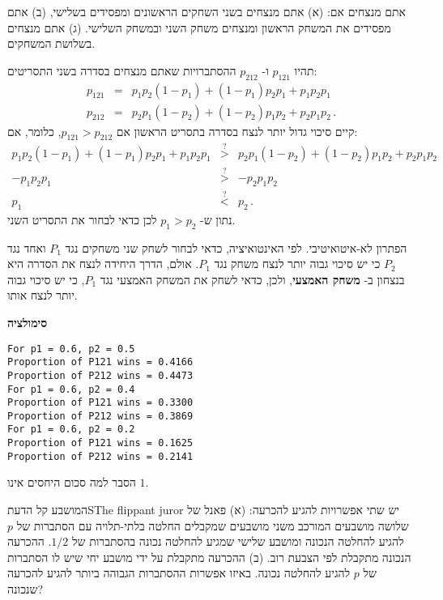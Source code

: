 
אתם מנצחים אם: (א) אתם מנצחים בשני השחקים הראשונים ומפסידים בשלישי, (ב) אתם מפסידים את המשחק הראשון ומנצחים משחק השני ובמשחק השלישי. (ג) אתם מנצחים בשלושת המשחקים.

תהיו 
$p_{121}$
ו-%
$p_{212}$
ההסתברויות שאתם מנצחים בסדרה בשני התסריטים:
\begin{eqnarray*}
p_{121}&=&p_1p_2(1-p_1) + (1-p_1)p_2p_1 + p_1p_2p_1\\
p_{212}&=&p_2p_1(1-p_2) + (1-p_2)p_1p_2 + p_2p_1p_2\,.
\end{eqnarray*}
קיים סיכוי גדול יותר לנצח בסדרה בתסריט הראשון אם 
$p_{121}>p_{212}$,
כלומר, אם:
\begin{eqnarray*}
p_1p_2(1-p_1) + (1-p_1)p_2p_1 + p_1p_2p_1 &\stackrel{?}{>}& 
p_2p_1(1-p_2) + (1-p_2)p_1p_2 + p_2p_1p_2\\
-p_1p_2p_1 & \stackrel{?}{>}& -p_2p_1p_2\\
p_1&\stackrel{?}{<}&p_2\,.
\end{eqnarray*}
נתון ש-%
$p_1>p_2$
לכן כדאי לבחור את התסריט השני.


הפתרון לא-איטואיטיבי. לפי האינטואיציה, כדאי לבחור לשחק שני משחקים נגד 
$P_1$
ואחד נגד
$P_2$
כי יש סיכוי גבוה יותר לנצח משחק נגד
$P_1$.
אולם, הדרך היחידה לנצח את הסדרה היא בנצחון ב-%
\textbf{משחק האמצעי},
ולכן, כדאי לשחק את המשחק האמצעי נגד 
$P_1$,
כי יש סיכוי גבוה יותר לנצח אותו.

\textbf{סימולציה}

\begin{verbatim}
For p1 = 0.6, p2 = 0.5
Proportion of P121 wins = 0.4166
Proportion of P212 wins = 0.4473
For p1 = 0.6, p2 = 0.4
Proportion of P121 wins = 0.3300
Proportion of P212 wins = 0.3869
For p1 = 0.6, p2 = 0.2
Proportion of P121 wins = 0.1625
Proportion of P212 wins = 0.2141
\end{verbatim}

הסבר למה סכום היחסים אינו 
$1$.


\begin{prob}{המושבע קל הדעת}{S}{The flippant juror}
יש שתי אפשרויות להגיע להכרעה: (א) פאנל של שלושה מושבעים המורכב משני מושבעים שמקבלים החלטה בלתי-תלויה עם הסתברות של 
$p$
להגיע להחלטה הנכונה ומושבע שלישי שמגיע להחלטה נכונה בהסתברות של
$1/2$.
ההכרעה הנכונה מתקבלת לפי הצבעת רוב. (ב) ההכרעה מתקבלת על ידי מושבע יחי שיש לו הסתברות של 
$p$
להגיע להחלטה נכונה. באיזו אפשרות ההסתברות הגבוהה ביותר להגיע להכרעה שנכונה?
\end{prob}


